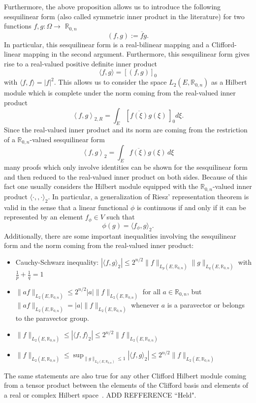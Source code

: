 \documentclass[12pt]{amsart}
\theoremstyle{definition}
\newcommand{\R}{\mathbb{R}}
\newcommand{\Cl}{\R_{0,n}}
\newcommand{\ba}{\overline}
\begin{document}
Furthermore, the above proposition allows us to introduce the following sesquilinear form (also called symmetric inner product in the literature) for two functions $f,g:\Omega\rightarrow$ $\Cl$
$$
(f,g):=\ba{f}g.
$$
In particular, this sesquilinear form is a real-bilinear mapping and a Clifford-linear mapping in the second argument. 
Furthermore, this sesquilinear form gives rise to a real-valued positive definite inner product 
$$
\langle f,g\rangle=[(f,g)]_0
$$
with $\langle f,f\rangle=|f|^2$. This allows us to consider the space $L_2(E, \Cl)$ as a Hilbert module which is complete under the norm coming from the real-valued inner product
\begin{equation}\label{Pro Int}
\left\langle f,g\right\rangle_{2,R}=\int_E [\ba{f(\xi)} g(\xi)\,]_0 d\xi. 
\end{equation}
Since the real-valued inner product and its norm are coming from the restriction of a $\Cl$-valued sesquilinear form
$$
\left\langle f,g\right\rangle_{2}=\int_E \ba{f(\xi)} g(\xi)\, d\xi
$$
many proofs which only involve identities can be shown for the sesquilinear form and then reduced to the real-valued inner product on both sides. Because of this fact one usually considers the Hilbert module equipped with the $\Cl$-valued inner product $\langle\cdot,,\cdot\rangle_{2}$. In particular, a generalization of Riesz' representation theorem is valid in the sense that a linear functional $\phi$ is continuous if and only if it can be represented by an element $f_\phi\in V$ such that
$$
\phi(g)=\langle f_\phi,g\rangle_{2}.
$$
Additionally, there are some important inequalities involving the sesquilinear form and the norm coming from the real-valued inner product:
\begin{itemize}
\item Cauchy-Schwarz inequality: $|\langle f,g\rangle_2|\leq 2^{n/2}\|f\|_{L_p(E,\Cl)} \|g\|_{L_q(E,\Cl)}$ with $\frac{1}{p}+\frac{1}{q}=1$
\item $\|a f\|_{L_2(E,\Cl)}\leq 2^{n/2}|a|\|f\|_{L_2(E,\Cl)}$ for all $a\in\Cl$, but $\|a f\|_{L_2(E,\Cl)}=|a|\|f\|_{L_2(E,\Cl)}$ whenever $a$ is a paravector or belongs to the paravector group.
\item $\|f\|_{L_2(E,\Cl)}\leq |\langle f,f \rangle_2|\leq 2^{n/2}\|f\|_{L_2(E,\Cl)}$
\item $\|f\|_{L_2(E,\Cl)}\leq \sup_{\|g\|_{L_2(E,\Cl)} \leq 1}|\langle f,g \rangle_2|\leq 2^{n/2}\|f\|_{L_2(E,\Cl)}$
\end{itemize}
The same statements are also true for any other Clifford Hilbert module coming from a tensor product between the elements of the Clifford basis and elements of a real or complex Hilbert space~\cite{Held}. {\color{red} ADD REFFERENCE ``Held"}.
\end{document}
